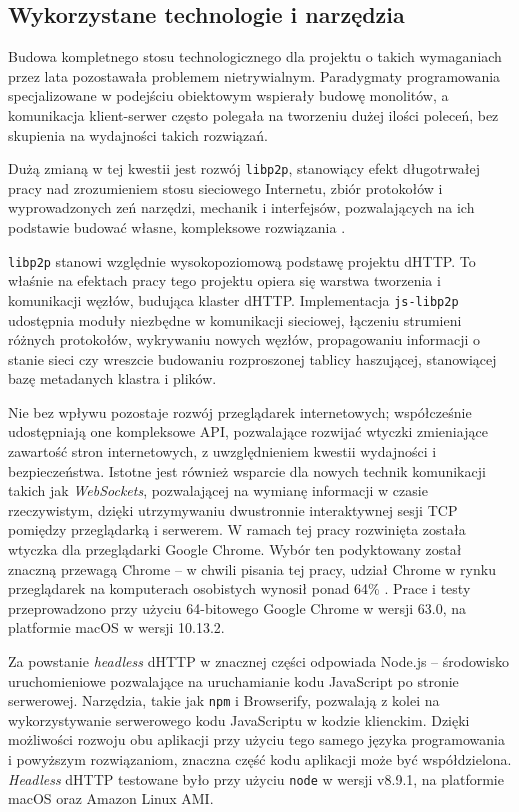 \subsection{Wykorzystane technologie i narzędzia}
\label{sec:techNTools}

Budowa kompletnego stosu technologicznego dla projektu o takich wymaganiach przez lata pozostawała problemem nietrywialnym. Paradygmaty programowania specjalizowane w podejściu obiektowym wspierały budowę monolitów, a komunikacja klient-serwer często polegała na tworzeniu dużej ilości poleceń, bez skupienia na wydajności takich rozwiązań.

Dużą zmianą w tej kwestii jest rozwój \texttt{libp2p}, stanowiący efekt długotrwałej pracy nad zrozumieniem stosu sieciowego Internetu, zbiór protokołów i wyprowadzonych zeń narzędzi, mechanik i interfejsów, pozwalających na ich podstawie budować własne, kompleksowe rozwiązania \cite{libp2p-specs}.

\texttt{libp2p} stanowi względnie wysokopoziomową podstawę projektu dHTTP. To właśnie na efektach pracy tego projektu opiera się warstwa tworzenia i komunikacji węzłów, budująca klaster dHTTP. Implementacja \texttt{js-libp2p} udostępnia moduły niezbędne w komunikacji sieciowej, łączeniu strumieni różnych protokołów, wykrywaniu nowych węzłów, propagowaniu informacji o stanie sieci czy wreszcie budowaniu rozproszonej tablicy haszującej, stanowiącej bazę metadanych klastra i plików.

Nie bez wpływu pozostaje rozwój przeglądarek internetowych; współcześnie udostępniają one kompleksowe API, pozwalające rozwijać wtyczki zmieniające zawartość stron internetowych, z uwzględnieniem kwestii wydajności i bezpieczeństwa. Istotne jest również wsparcie dla nowych technik komunikacji takich jak {\em WebSockets}, pozwalającej na wymianę informacji w czasie rzeczywistym, dzięki utrzymywaniu dwustronnie interaktywnej sesji TCP pomiędzy przeglądarką i serwerem. W ramach tej pracy rozwinięta została wtyczka dla przeglądarki Google Chrome. Wybór ten podyktowany został znaczną przewagą Chrome -- w chwili pisania tej pracy, udział Chrome w rynku przeglądarek na komputerach osobistych wynosił ponad 64\% \cite{chromeStats}. Prace i testy przeprowadzono przy użyciu 64-bitowego Google Chrome w wersji 63.0, na platformie macOS w wersji 10.13.2.

Za powstanie {\em headless} dHTTP w znacznej części odpowiada Node.js -- środowisko uruchomieniowe pozwalające na uruchamianie kodu JavaScript po stronie serwerowej.  Narzędzia, takie jak \texttt{npm} i Browserify, pozwalają z kolei na wykorzystywanie serwerowego kodu JavaScriptu w kodzie klienckim. Dzięki możliwości rozwoju obu aplikacji przy użyciu tego samego języka programowania i powyższym rozwiązaniom, znaczna część  kodu aplikacji może być współdzielona. {\em Headless} dHTTP testowane było przy użyciu \texttt{node} w wersji v8.9.1, na platformie macOS oraz Amazon Linux AMI.

